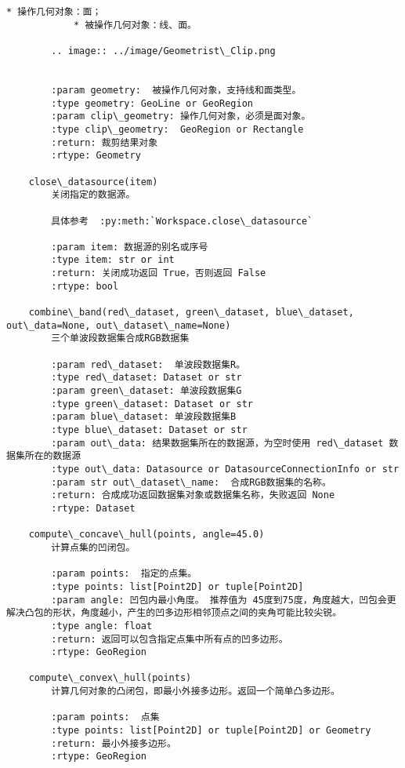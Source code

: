 \documentclass[11pt]{article}
\begin{document}
\begin{Verbatim}[commandchars=\\\{\}]
            * 操作几何对象：面；
            * 被操作几何对象：线、面。
        
        .. image:: ../image/Geometrist\_Clip.png
        
        
        :param geometry:  被操作几何对象，支持线和面类型。
        :type geometry: GeoLine or GeoRegion
        :param clip\_geometry: 操作几何对象，必须是面对象。
        :type clip\_geometry:  GeoRegion or Rectangle
        :return: 裁剪结果对象
        :rtype: Geometry
    
    close\_datasource(item)
        关闭指定的数据源。
        
        具体参考  :py:meth:`Workspace.close\_datasource`
        
        :param item: 数据源的别名或序号
        :type item: str or int
        :return: 关闭成功返回 True，否则返回 False
        :rtype: bool
    
    combine\_band(red\_dataset, green\_dataset, blue\_dataset, out\_data=None, out\_dataset\_name=None)
        三个单波段数据集合成RGB数据集
        
        :param red\_dataset:  单波段数据集R。
        :type red\_dataset: Dataset or str
        :param green\_dataset: 单波段数据集G
        :type green\_dataset: Dataset or str
        :param blue\_dataset: 单波段数据集B
        :type blue\_dataset: Dataset or str
        :param out\_data: 结果数据集所在的数据源，为空时使用 red\_dataset 数据集所在的数据源
        :type out\_data: Datasource or DatasourceConnectionInfo or str
        :param str out\_dataset\_name:  合成RGB数据集的名称。
        :return: 合成成功返回数据集对象或数据集名称，失败返回 None
        :rtype: Dataset
    
    compute\_concave\_hull(points, angle=45.0)
        计算点集的凹闭包。
        
        :param points:  指定的点集。
        :type points: list[Point2D] or tuple[Point2D]
        :param angle: 凹包内最小角度。 推荐值为 45度到75度，角度越大，凹包会更解决凸包的形状，角度越小，产生的凹多边形相邻顶点之间的夹角可能比较尖锐。
        :type angle: float
        :return: 返回可以包含指定点集中所有点的凹多边形。
        :rtype: GeoRegion
    
    compute\_convex\_hull(points)
        计算几何对象的凸闭包，即最小外接多边形。返回一个简单凸多边形。
        
        :param points:  点集
        :type points: list[Point2D] or tuple[Point2D] or Geometry
        :return: 最小外接多边形。
        :rtype: GeoRegion
    

\end{Verbatim}
\end{document}
